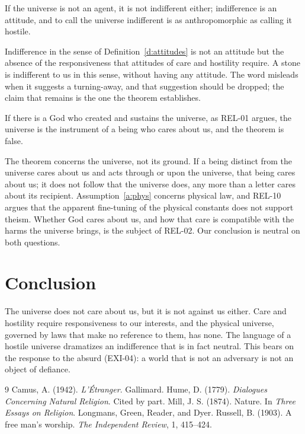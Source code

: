 \documentclass{situationist-preprint}
\begin{document}
\begin{objection}\label{o:anthro}
If the universe is not an agent, it is not indifferent either; indifference is an attitude, and to call the universe indifferent is as anthropomorphic as calling it hostile.
\end{objection}

\begin{reply}
Indifference in the sense of Definition~\ref{d:attitudes} is not an attitude but the absence of the responsiveness that attitudes of care and hostility require. A stone is indifferent to us in this sense, without having any attitude. The word misleads when it suggests a turning-away, and that suggestion should be dropped; the claim that remains is the one the theorem establishes.
\end{reply}

\begin{objection}[Theism]\label{o:theism}
If there is a God who created and sustains the universe, as REL-01 argues, the universe is the instrument of a being who cares about us, and the theorem is false.
\end{objection}

\begin{reply}
The theorem concerns the universe, not its ground. If a being distinct from the universe cares about us and acts through or upon the universe, that being cares about us; it does not follow that the universe does, any more than a letter cares about its recipient. Assumption~\ref{a:phys} concerns physical law, and REL-10 argues that the apparent fine-tuning of the physical constants does not support theism. Whether God cares about us, and how that care is compatible with the harms the universe brings, is the subject of REL-02. Our conclusion is neutral on both questions.
\end{reply}

\section{Conclusion}

The universe does not care about us, but it is not against us either. Care and hostility require responsiveness to our interests, and the physical universe, governed by laws that make no reference to them, has none. The language of a hostile universe dramatizes an indifference that is in fact neutral. This bears on the response to the absurd (EXI-04): a world that is not an adversary is not an object of defiance.

\begin{thebibliography}{9}\small
{} Camus, A. (1942). \emph{L'\'Etranger}. Gallimard.
 Hume, D. (1779). \emph{Dialogues Concerning Natural Religion}. Cited by part.
 Mill, J. S. (1874). Nature. In \emph{Three Essays on Religion}. Longmans, Green, Reader, and Dyer.
 Russell, B. (1903). A free man's worship. \emph{The Independent Review}, 1, 415--424.
\end{thebibliography}
\end{document}
